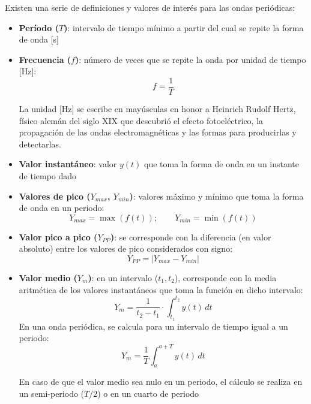 Existen una serie de definiciones y valores de interés para las ondas
periódicas:
\begin{itemize}
\item \textbf{Período ($T$)}: intervalo de tiempo mínimo a partir del
  cual se repite la forma de onda [s]
\item \textbf{Frecuencia ($f$)}: número de veces que se repite la onda
  por unidad de tiempo [Hz]:
  \begin{equation*}
    f = \dfrac{1}{T}
  \end{equation*}
  \begin{remark}
    La unidad [Hz] se escribe en mayúsculas en honor a Heinrich Rudolf
    Hertz, físico alemán del siglo XIX que descubrió el efecto
    fotoeléctrico, la propagación de las ondas electromagnéticas y las
    formas para producirlas y detectarlas.
  \end{remark}
\item \textbf{Valor instantáneo}: valor $y(t)$ que toma la forma de
  onda en un instante de tiempo dado
\item \textbf{Valores de pico ($Y_{max}$, $Y_{min}$)}: valores máximo
  y mínimo que toma la forma de onda en un periodo:
  \begin{equation*}
    Y_{max} = \max(f(t)); \qquad Y_{min} = \min(f(t))
  \end{equation*}
\item \textbf{Valor pico a pico ($Y_{PP}$)}: se corresponde con la
  diferencia (en valor absoluto) entre los valores de pico
  considerados con signo:
  \begin{equation*}
    Y_{PP}=|Y_{max} - Y_{min}|
  \end{equation*}
\item \textbf{Valor medio ($Y_m$)}: en un intervalo ($t_1,t_2$),
  corresponde con la media aritmética de los valores instantáneos que
  toma la función en dicho intervalo:
  \begin{equation*}
    Y_m=\dfrac{1}{t_2-t_1}\cdot\int_{t_1}^{t_2}y(t)\, dt
  \end{equation*}
  En una onda periódica, se calcula para un intervalo de tiempo igual
  a un periodo:
  \begin{equation}\label{eq:valor_medio}
    \boxed{Y_m=\frac{1}{T}\int_{a}^{a+T}y(t)\, dt}
  \end{equation}
  \begin{remark}
    En caso de que el valor medio sea nulo en un periodo, el cálculo
    se realiza en un semi-periodo ($T/2$) o en un cuarto de periodo

\end{remark}
\end{itemize}
